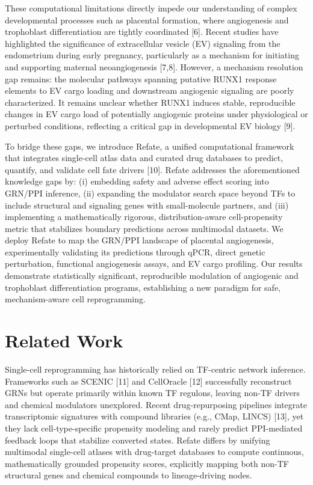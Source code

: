 \documentclass[11pt,a4paper]{article}
\begin{document}
These computational limitations directly impede our understanding of complex developmental processes such as placental formation, where angiogenesis and trophoblast differentiation are tightly coordinated [6]. Recent studies have highlighted the significance of extracellular vesicle (EV) signaling from the endometrium during early pregnancy, particularly as a mechanism for initiating and supporting maternal neoangiogenesis [7,8]. However, a mechanism resolution gap remains: the molecular pathways spanning putative RUNX1 response elements to EV cargo loading and downstream angiogenic signaling are poorly characterized. It remains unclear whether RUNX1 induces stable, reproducible changes in EV cargo load of potentially angiogenic proteins under physiological or perturbed conditions, reflecting a critical gap in developmental EV biology [9].

To bridge these gaps, we introduce Refate, a unified computational framework that integrates single-cell atlas data and curated drug databases to predict, quantify, and validate cell fate drivers [10]. Refate addresses the aforementioned knowledge gaps by: (i) embedding safety and adverse effect scoring into GRN/PPI inference, (ii) expanding the modulator search space beyond TFs to include structural and signaling genes with small-molecule partners, and (iii) implementing a mathematically rigorous, distribution-aware cell-propensity metric that stabilizes boundary predictions across multimodal datasets. We deploy Refate to map the GRN/PPI landscape of placental angiogenesis, experimentally validating its predictions through qPCR, direct genetic perturbation, functional angiogenesis assays, and EV cargo profiling. Our results demonstrate statistically significant, reproducible modulation of angiogenic and trophoblast differentiation programs, establishing a new paradigm for safe, mechanism-aware cell reprogramming.

\section{Related Work}
Single-cell reprogramming has historically relied on TF-centric network inference. Frameworks such as SCENIC [11] and CellOracle [12] successfully reconstruct GRNs but operate primarily within known TF regulons, leaving non-TF drivers and chemical modulators unexplored. Recent drug-repurposing pipelines integrate transcriptomic signatures with compound libraries (e.g., CMap, LINCS) [13], yet they lack cell-type-specific propensity modeling and rarely predict PPI-mediated feedback loops that stabilize converted states. Refate differs by unifying multimodal single-cell atlases with drug-target databases to compute continuous, mathematically grounded propensity scores, explicitly mapping both non-TF structural genes and chemical compounds to lineage-driving nodes.
\end{document}

